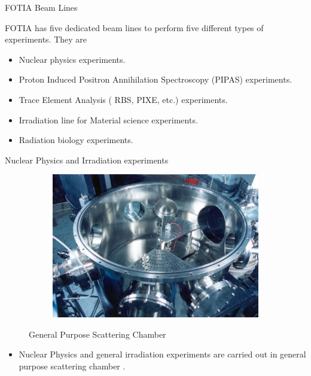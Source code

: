 \documentclass[11pt]{beamer}
\begin{document}
\begin{frame}{FOTIA Beam Lines}

FOTIA has five dedicated beam lines to perform five different types of experiments. They are  
  \begin{itemize}
      
    \item Nuclear physics experiments.
	\item Proton Induced Positron Annihilation Spectroscopy (PIPAS) experiments.
	\item Trace Element Analysis ( RBS, PIXE, etc.) experiments.
	\item Irradiation line for Material science experiments.
	\item Radiation biology experiments.
            
   \end{itemize}

\end{frame}

\begin{frame}{Nuclear Physics and Irradiation experiments}

  \begin{figure}
        \centering
        \begin{subfigure}[b]{0.5\textwidth}
                \includegraphics[width=\textwidth]{Scattering_chamber.jpg}
        \end{subfigure}%
               
        \caption{General Purpose Scattering Chamber}\label{fig:Scattering Chamber}
\end{figure}
  
  
  \begin{itemize}
    
    \item Nuclear Physics and general irradiation experiments are carried out in general purpose scattering chamber . 
			           
   \end{itemize}


\end{frame}
\end{document}
